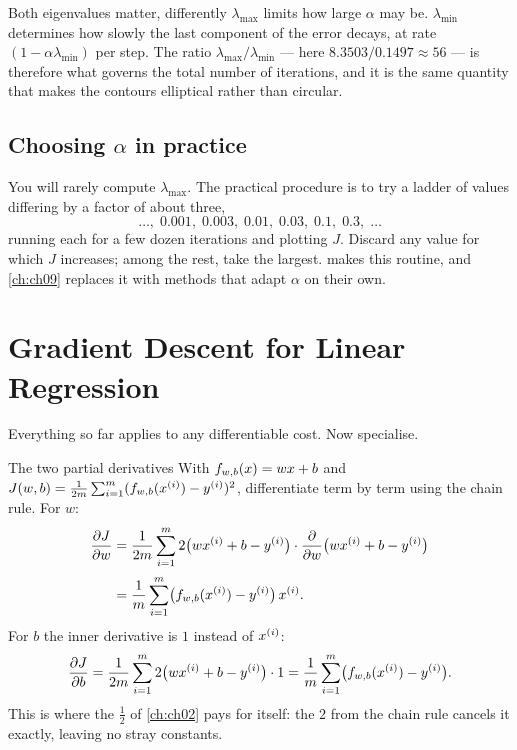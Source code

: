 \begin{keyinsight}{Both eigenvalues matter, differently}
$\lambda_{\max}$ limits how large $\alpha$ may be. $\lambda_{\min}$ determines
how slowly the last component of the error decays, at rate
$(1-\alpha\lambda_{\min})$ per step. The ratio $\lambda_{\max}/\lambda_{\min}$
--- here $8.3503/0.1497 \approx 56$ --- is therefore what governs the total
number of iterations, and it is the same quantity that makes the contours
elliptical rather than circular.
\end{keyinsight}

\subsection{Choosing $\alpha$ in practice}

You will rarely compute $\lambda_{\max}$. The practical procedure is to try a
ladder of values differing by a factor of about three,
\[
  \dots,\; 0.001,\; 0.003,\; 0.01,\; 0.03,\; 0.1,\; 0.3,\; \dots
\]
running each for a few dozen iterations and plotting $J$. Discard any value for
which $J$ increases; among the rest, take the largest.  makes this
routine, and \cref{ch:ch09} replaces it with methods that adapt $\alpha$ on
their own.

\section{Gradient Descent for Linear Regression}
\label{sec:gd-linreg}

Everything so far applies to any differentiable cost. Now specialise.

\begin{derivation}{The two partial derivatives}
With $f_{w,b}(x) = wx+b$ and
$J(w,b) = \frac{1}{2m}\sum_{i=1}^{m}(f_{w,b}(x^{(i)})-y^{(i)})^2$, differentiate
term by term using the chain rule. For $w$:
\[
  \begin{aligned}
    \frac{\partial J}{\partial w}
      &= \frac{1}{2m}\sum_{i=1}^{m} 2\bigl(wx^{(i)}+b-y^{(i)}\bigr)
          \cdot\frac{\partial}{\partial w}\bigl(wx^{(i)}+b-y^{(i)}\bigr)\\[2pt]
      &= \frac{1}{m}\sum_{i=1}^{m}\bigl(f_{w,b}(x^{(i)})-y^{(i)}\bigr)\,x^{(i)}.
  \end{aligned}
\]
For $b$ the inner derivative is $1$ instead of $x^{(i)}$:
\[
  \frac{\partial J}{\partial b}
    = \frac{1}{2m}\sum_{i=1}^{m} 2\bigl(wx^{(i)}+b-y^{(i)}\bigr)\cdot 1
    = \frac{1}{m}\sum_{i=1}^{m}\bigl(f_{w,b}(x^{(i)})-y^{(i)}\bigr).
\]
This is where the $\tfrac12$ of \cref{ch:ch02} pays for itself: the $2$ from the
chain rule cancels it exactly, leaving no stray constants.
\end{derivation}

